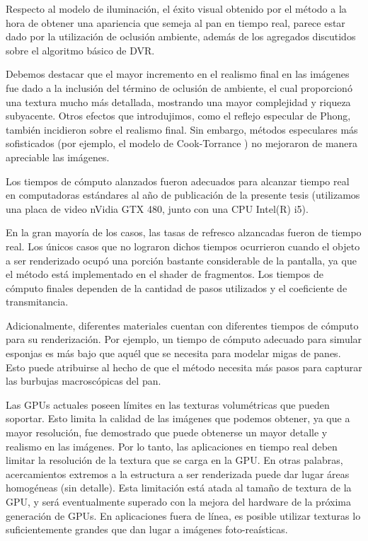 Respecto al modelo de iluminación, el éxito visual obtenido por el método a la hora de obtener una apariencia que semeja al pan en tiempo real, parece estar dado por la utilización de oclusión ambiente, además de los agregados discutidos sobre el algoritmo básico de DVR.

Debemos destacar que el mayor incremento en el realismo final en las imágenes fue dado a la inclusión del término de oclusión de ambiente, el cual proporcionó una textura mucho más detallada, mostrando una mayor complejidad y riqueza subyacente.
Otros efectos que introdujimos, como el reflejo especular de Phong, también incidieron sobre el realismo final.
Sin embargo, métodos especulares más sofisticados (por ejemplo, el modelo de Cook-Torrance \cite{Cook1982}) no mejoraron de manera apreciable las imágenes.


Los tiempos de cómputo alanzados fueron adecuados para alcanzar tiempo real en computadoras estándares al año de publicación de la presente tesis (utilizamos una placa de video nVidia GTX 480, junto con una CPU Intel(R) i5).

En la gran mayoría de los casos, las tasas de refresco alzancadas fueron de tiempo real.
Los únicos casos que no lograron dichos tiempos ocurrieron cuando el objeto a ser renderizado ocupó una porción bastante considerable de la pantalla, ya que el método está implementado en el shader de fragmentos.
Los tiempos de cómputo finales dependen de la cantidad de pasos utilizados y el coeficiente de transmitancia.

Adicionalmente, diferentes materiales cuentan con diferentes tiempos de cómputo para su renderización.
Por ejemplo, un tiempo de cómputo adecuado para simular esponjas es más bajo que aquél que se necesita para modelar migas de panes.
Esto puede atribuirse al hecho de que el método necesita más pasos para capturar las burbujas macroscópicas del pan.

Las GPUs actuales poseen límites en las texturas volumétricas que pueden soportar.
Esto limita la calidad de las imágenes que podemos obtener, ya que a mayor resolución, fue demostrado que puede obtenerse un mayor detalle y realismo en las imágenes.
Por lo tanto, las aplicaciones en tiempo real deben limitar la resolución de la textura que se carga en la GPU.
En otras palabras, acercamientos extremos a la estructura a ser renderizada puede dar lugar áreas homogéneas (sin detalle).
Esta limitación está atada al tamaño de textura de la GPU, y será eventualmente superado con la mejora del hardware de la próxima generación de GPUs.
En aplicaciones fuera de línea, es posible utilizar texturas lo suficientemente grandes que dan lugar a imágenes foto-reaísticas.

